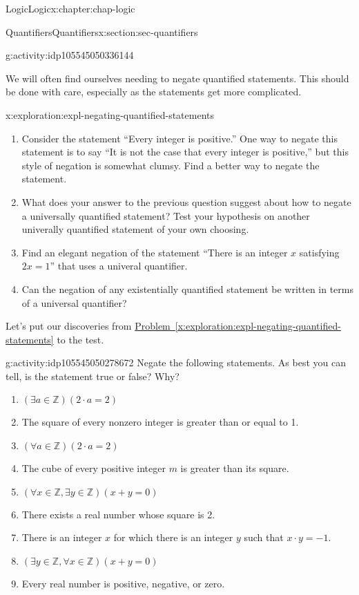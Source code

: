 \documentclass[oneside,10pt,]{book}
\newcommand{\xreffont}{\relax}
\def\Z{{\mathbb Z}}
\newcommand{\Z}{\mathbb Z}
\begin{document}
\begin{chapterptx}{Logic}{}{Logic}{}{}{x:chapter:chap-logic}
\begin{sectionptx}{Quantifiers}{}{Quantifiers}{}{}{x:section:sec-quantifiers}
\begin{activity}{}{g:activity:idp105545050336144}
\end{activity}%
We will often find ourselves needing to negate quantified statements. This should be done with care, especially as the statements get more complicated.%
\begin{exploration}{}{x:exploration:expl-negating-quantified-statements}%
%
\begin{enumerate}
\item{}Consider the statement ``Every integer is positive.'' One way to negate this statement is to say ``It is not the case that every integer is positive,'' but this style of negation is somewhat clumsy. Find a better way to negate the statement.%
\item{}What does your answer to the previous question suggest about how to negate a universally quantified statement? Test your hypothesis on another univerally quantified statement of your own choosing.%
\item{}Find an elegant negation of the statement ``There is an integer \(x\) satisfying \(2x = 1\)'' that uses a univeral quantifier.%
\item{}Can the negation of any existentially quantified statement be written in terms of a universal quantifier?%
\end{enumerate}
\end{exploration}%
Let's put our discoveries from \hyperref[x:exploration:expl-negating-quantified-statements]{Problem~{\xreffont\ref{x:exploration:expl-negating-quantified-statements}}} to the test.%
\begin{activity}{}{g:activity:idp105545050278672}%
Negate the following statements. As best you can tell, is the statement true or false? Why?%
%
\begin{enumerate}
\item{}\(\displaystyle (\exists a\in\Z ) (2\cdot a = 2)\)%
\item{}The square of every nonzero integer is greater than or equal to 1.%
\item{}\(\displaystyle (\forall a\in \Z) (2\cdot a = 2)\)%
\item{}The cube of every positive integer \(m\) is greater than its square.%
\item{}\(\displaystyle (\forall x\in \Z, \exists y\in\Z)(x+y=0)\)%
\item{}There exists a real number whose square is 2.%
\item{}There is an integer \(x\) for which there is an integer \(y\) such that \(x\cdot y = -1\).%
\item{}\(\displaystyle (\exists y\in \Z, \forall x\in \Z)(x+y=0)\)%
\item{}Every real number is positive, negative, or zero.%
\end{enumerate}
\end{activity}%
\end{sectionptx}
\end{chapterptx}
\end{document}
